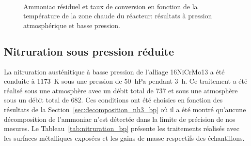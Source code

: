 \begin{figure}[h]
  \centering
  \\

  \caption{\label{fig:ammoniac_residuel}Ammoniac résiduel et taux de conversion en fonction de la température de la zone chaude du réacteur: résultats \protect{} à pression atmosphérique et \protect{} basse pression.}
\end{figure}

\subsection{Nitruration sous pression réduite}
\label{sec:nitruration-ammoniac}

La nitruration austénitique à basse pression de l'alliage 16NiCrMo13 a été conduite à \SI{1173}{\kelvin} sous une pression de \SI{50}{\hecto\pascal} pendant \SI{3}{\hour}. Ce traitement a été réalisé sous une atmosphère  avec un débit total de \SI{737}{\sccm} et sous une atmosphère  sous un débit total de \SI{682}{\sccm}.  Ces conditions ont été choisies en fonction des résultats de la Section~\ref{sec:decomposition_nh3_bp} où il a été montré qu'aucune décomposition de l'ammoniac n'est détectée dans la limite de précision de nos mesures. Le Tableau~\ref{tab:nitruration_bp} présente les traitements réalisés avec les surfaces métalliques exposées et les gains de masse respectifs des échantillons.

